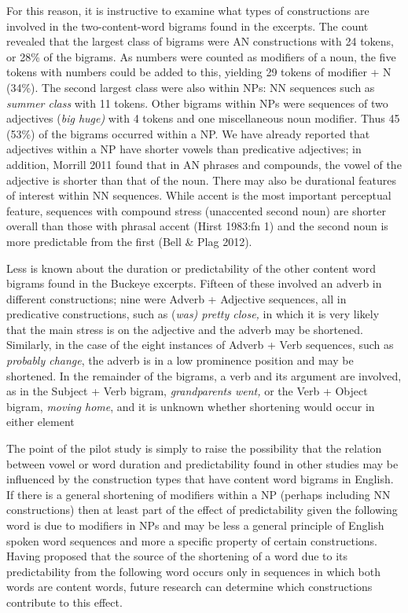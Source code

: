 \documentclass[12pt]{article}
\newenvironment{styleStandard}{\setlength\leftskip{0cm}\setlength\rightskip{0cm plus 1fil}\setlength\parindent{0cm}\setlength\parfillskip{0pt plus 1fil}\setlength\parskip{0in plus 1pt}\writerlistparindent\writerlistleftskip\leavevmode\normalfont\normalsize\writerlistlabel\ignorespaces}{\unskip\vspace{0.111in plus 0.0111in}\par}
\newcommand\writerlistleftskip{}
\newcommand\writerlistparindent{}
\newcommand\writerlistlabel{}
\begin{document}
\begin{styleStandard}
For this reason, it is instructive to examine what types of constructions are involved in the two-content-word bigrams found in the excerpts. The count revealed that the largest class of bigrams were AN constructions with 24 tokens, or 28\% of the bigrams. As numbers were counted as modifiers of a noun, the five tokens with numbers could be added to this, yielding 29 tokens of modifier + N (34\%). The second largest class were also within NPs: NN sequences such as \textit{summer class }with 11 tokens. Other bigrams within NPs were sequences of two adjectives (\textit{big huge)} with 4 tokens and one miscellaneous noun modifier. Thus 45 (53\%) of the bigrams occurred within a NP. We have already reported that adjectives within a NP have shorter vowels than predicative adjectives; in addition, Morrill 2011 found that in AN phrases and compounds, the vowel of the adjective is shorter than that of the noun. There may also be durational features of interest within NN sequences. While accent is the most important perceptual feature, sequences with compound stress (unaccented second noun) are shorter overall than those with phrasal accent (Hirst 1983:fn 1) and the second noun is more predictable from the first (Bell \& Plag 2012). 
\end{styleStandard}

\begin{styleStandard}
Less is known about the duration or predictability of the other content word bigrams found in the Buckeye excerpts. Fifteen of these involved an adverb in different constructions; nine were Adverb + Adjective sequences, all in predicative constructions, such as (\textit{was) pretty close, }in which it is very likely that the main stress is on the adjective and the adverb may be shortened. Similarly, in the case of the eight instances of Adverb + Verb sequences, such as \textit{probably change}, the adverb is in a low prominence position and may be shortened. In the remainder of the bigrams, a verb and its argument are involved, as in the Subject + Verb bigram, \textit{grandparents went,} or the Verb + Object bigram, \textit{moving home}, and it is unknown whether shortening would occur in either element
\end{styleStandard}

\begin{styleStandard}
The point of the pilot study is simply to raise the possibility that the relation between vowel or word duration and predictability found in other studies may be influenced by the construction types that have content word bigrams in English. If there is a general shortening of modifiers within a NP (perhaps including NN constructions) then at least part of the effect of predictability given the following word is due to modifiers in NPs and may be less a general principle of English spoken word sequences and more a specific property of certain constructions. Having proposed that the source of the shortening of a word due to its predictability from the following word occurs only in sequences in which both words are content words, future research can determine which constructions contribute to this effect. 
\end{styleStandard}
\end{document}
